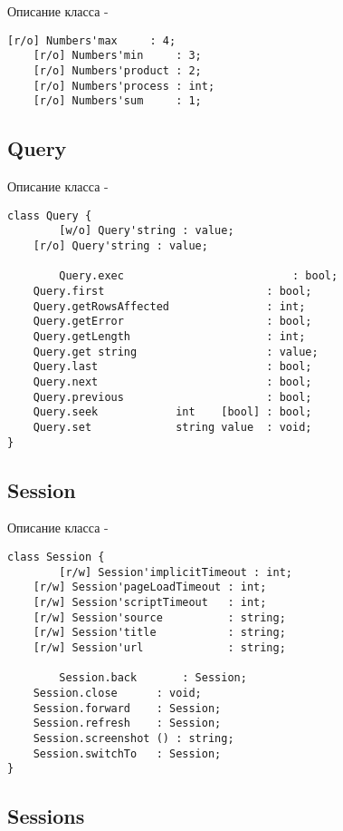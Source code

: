 \noindent Описание класса  -
\begin{lstlisting}[numbers=none]
        [r/o] Numbers'max     : 4;
	[r/o] Numbers'min     : 3;
	[r/o] Numbers'product : 2;
	[r/o] Numbers'process : int;
	[r/o] Numbers'sum     : 1;
\end{lstlisting}

\subsection{{\color{orange} Query}}

\noindent Описание класса  -
\begin{lstlisting}[numbers=none]
class Query {
        [w/o] Query'string : value;
	[r/o] Query'string : value;
	
        Query.exec                          : bool;
	Query.first                         : bool;
	Query.getRowsAffected               : int;
	Query.getError                      : bool;
	Query.getLength                     : int;
	Query.get string                    : value;
	Query.last                          : bool;
	Query.next                          : bool;
	Query.previous                      : bool;
	Query.seek            int    [bool] : bool;
	Query.set             string value  : void;
}
\end{lstlisting}

\subsection{{\color{orange} Session}}

\noindent Описание класса  -
\begin{lstlisting}[numbers=none]
class Session {
        [r/w] Session'implicitTimeout : int;
	[r/w] Session'pageLoadTimeout : int;
	[r/w] Session'scriptTimeout   : int;
	[r/w] Session'source          : string;
	[r/w] Session'title           : string;
	[r/w] Session'url             : string;
	
        Session.back       : Session;
	Session.close      : void;
	Session.forward    : Session;
	Session.refresh    : Session;
	Session.screenshot () : string;
	Session.switchTo   : Session;
}
\end{lstlisting}

\subsection{{\color{orange} Sessions}}


